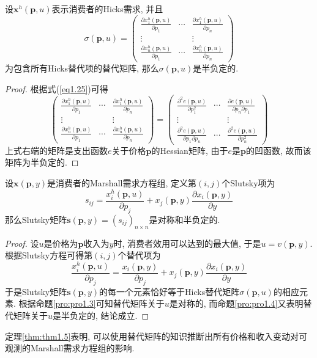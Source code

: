 \documentclass[cn, 12pt, math=mtpro2, bibstyle=apa, blue, twocol]{elegantbook}
\newcommand{\p}{\mathbf{p}}
\newcommand{\x}{\mathbf{x}}
\begin{document}
\begin{proposition}\label{pro:pro1.4}
设$\x^h(\p,u)$表示消费者的Hicks需求, 并且
$$\sigma(\p,u)=\begin{pmatrix}
                 \frac{\partial x_1^h(\p,u)}{\partial p_1} & \cdots & \frac{\partial x_1^h(\p,u)}{\partial p_n} \\
                 \vdots &  & \vdots \\
                 \frac{\partial x_n^h(\p,u)}{\partial p_1} & \cdots & \frac{\partial x_n^h(\p,u)}{\partial p_n}
               \end{pmatrix}$$
为包含所有Hicks替代项的替代矩阵, 那么$\sigma(\p,u)$是半负定的.
\end{proposition}
\begin{proof}
  根据式(\ref{eq1.25})可得
  $$\begin{pmatrix}
                 \frac{\partial x_1^h(\p,u)}{\partial p_1} & \cdots & \frac{\partial x_1^h(\p,u)}{\partial p_n} \\
                 \vdots &  & \vdots \\
                 \frac{\partial x_n^h(\p,u)}{\partial p_1} & \cdots & \frac{\partial x_n^h(\p,u)}{\partial p_n}
               \end{pmatrix}=\begin{pmatrix}
                               \frac{\partial^2 e(\p,u)}{\partial p_1^2} & \cdots & \frac{\partial e(\p,u)}{\partial p_n\partial p_1} \\
                               \vdots &  & \vdots \\
                               \frac{\partial^2 e(\p,u)}{\partial p_1\partial p_n} & \cdots & \frac{\partial^2 e(\p,u)}{\partial p_n^2}
                             \end{pmatrix}$$
  上式右端的矩阵是支出函数$e$关于价格$\p$的Hessian矩阵, 由于$e$是$\p$的凹函数, 故而该矩阵为半负定的.
\end{proof}
\begin{theorem}\label{thm:thm1.5}
  设$\x(\p,y)$是消费者的Marshall需求方程组, 定义第$(i,j)$个Slutsky项为
  $$s_{ij}=\frac{x_i^h(\p,u)}{\partial p_j}+x_j(\p,y)\frac{\partial x_i(\p,y)}{\partial y}$$
  那么Slutsky矩阵$\mathbf{s}(\p,y)=(s_{ij})_{n\times n}$是对称和半负定的.
\end{theorem}
\begin{proof}
  设$u$是价格为$\p$收入为$y$时, 消费者效用可以达到的最大值, 于是$u=v(\p,y)$. 根据Slutsky方程可得第$(i,j)$个替代项为
  $$\frac{x_i^h(\p,u)}{\partial p_j}=\frac{x_i(\p,y)}{\partial p_j}+x_j(\p,y)\frac{\partial x_i(\p,y)}{\partial y}$$
  于是Slutsky矩阵$\mathbf{s}(\p,y)$的每一个元素恰好等于Hicks替代矩阵$\sigma(\p,u)$的相应元素. 根据命题\ref{pro:pro1.3}可知替代矩阵关于$u$是对称的, 而命题\ref{pro:pro1.4}又表明替代矩阵关于$u$是半负定的, 结论成立.
\end{proof}
定理\ref{thm:thm1.5}表明, 可以使用替代矩阵的知识推断出所有价格和收入变动对可观测的Marshall需求方程组的影响.
\end{document}
